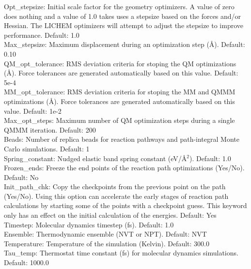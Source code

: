 \documentclass[12pt]{report}
\begin{document}
Opt\_stepsize: Initial scale factor for the geometry optimizers.
A value of zero does nothing and a value of 1.0 takes uses a stepsize based
on the forces and/or Hessian. The LICHEM optimizers will attempt to adjust
the stepsize to improve performance.
Default: 1.0 \\

Max\_stepsize: Maximum displacement during an optimization step (\AA).
Default: 0.10 \\

QM\_opt\_tolerance: RMS deviation criteria for stoping the QM optimizations
(\AA).
Force tolerances are generated automatically based on this value.
Default: 5e-4 \\

MM\_opt\_tolerance: RMS deviation criteria for stoping the MM and QMMM
optimizations (\AA).
Force tolerances are generated automatically based on this value.
Default: 1e-2 \\

Max\_opt\_steps: Maximum number of QM optimization steps during a single
QMMM iteration.
Default: 200 \\

Beads: Number of replica beads for reaction pathways and path-integral
Monte Carlo simulations.
Default: 1 \\

Spring\_constant: Nudged elastic band spring constant (eV/\AA$^2$).
Default: 1.0 \\

Frozen\_ends: Freeze the end points of the reaction path optimizations
(Yes/No).
Default: No \\

Init\_path\_chk: Copy the checkpoints from the previous point on the path
(Yes/No).
Using this option can accelerate the early stages of reaction path
calculations by starting some of the points with a checkpoint guess.
This keyword only has an effect on the initial calculation of the energies.
Default: Yes \\

Timestep: Molecular dynamics timestep (fs).
Default: 1.0 \\

Ensemble: Thermodynamic ensemble (NVT or NPT).
Default: NVT \\

Temperature: Temperature of the simulation (Kelvin).
Default: 300.0 \\

Tau\_temp: Thermostat time constant (fs) for molecular dynamics simulations.
Default: 1000.0 \\
\end{document}
